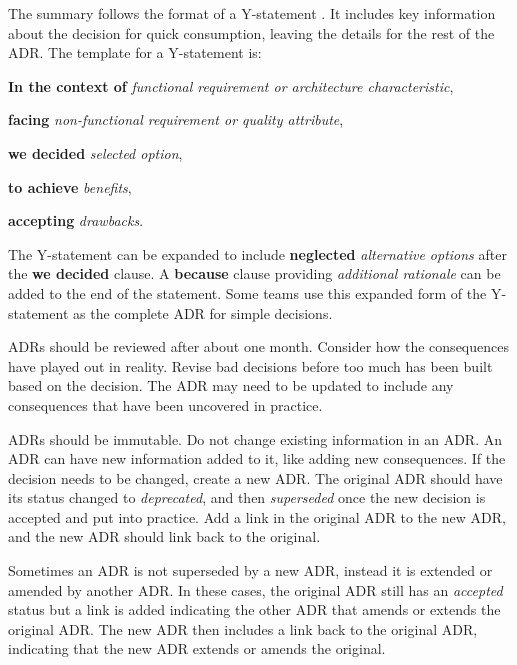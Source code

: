 The summary follows the format of a Y-statement \cite{y-statement}.
It includes key information about the decision for quick consumption, leaving the details for the rest of the ADR.
The template for a Y-statement is:

\textbf{In the context of} \emph{functional requirement or architecture characteristic},

\textbf{facing} \emph{non-functional requirement or quality attribute},

\textbf{we decided} \emph{selected option},

\textbf{to achieve} \emph{benefits},

\textbf{accepting} \emph{drawbacks}.

\noindent
The Y-statement can be expanded to include \textbf{neglected} \emph{alternative options} after the \textbf{we decided} clause.
A \textbf{because} clause providing \emph{additional rationale} can be added to the end of the statement.
Some teams use this expanded form of the Y-statement as the complete ADR for simple decisions.

ADRs should be reviewed after about one month.
Consider how the consequences have played out in reality.
Revise bad decisions before too much has been built based on the decision.
The ADR may need to be updated to include any consequences that have been uncovered in practice.

ADRs should be immutable. Do not change existing information in an ADR.
An ADR can have new information added to it, like adding new consequences.
If the decision needs to be changed, create a new ADR.
The original ADR should have its status changed to \emph{deprecated},
and then \emph{superseded} once the new decision is accepted and put into practice.
Add a link in the original ADR to the new ADR, and the new ADR should link back to the original.

Sometimes an ADR is not superseded by a new ADR, instead it is extended or amended by another ADR.
In these cases, the original ADR still has an \emph{accepted} status but
a link is added indicating the other ADR that amends or extends the original ADR.
The new ADR then includes a link back to the original ADR, indicating that the new ADR extends or amends the original.

\filbreak
